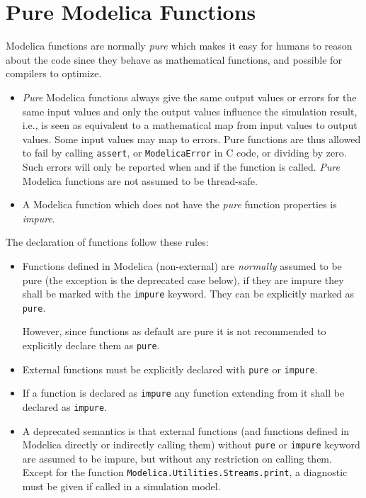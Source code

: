 \section{Pure Modelica Functions}\label{pure-modelica-functions}

Modelica functions are normally \emph{pure} which makes it easy for humans to reason about the code since they behave as mathematical functions, and possible for compilers to optimize.

\begin{itemize}
\item
  \emph{Pure} Modelica functions always give the same output values or errors for the same input values and only the output values influence the simulation result, i.e., is seen as equivalent to a mathematical map from input values to output values.
  Some input values may map to errors.
  Pure functions are thus allowed to fail by calling \lstinline!assert!, or \lstinline[language=C]!ModelicaError! in C code, or dividing by zero.
  Such errors will only be reported when and if the function is called.
  \emph{Pure} Modelica functions are not assumed to be thread-safe.
\item
  A Modelica function which does not have the \emph{pure} function properties is \emph{impure}.
\end{itemize}

The declaration of functions follow these rules:
\begin{itemize}
\item
  Functions defined in Modelica (non-external) are \emph{normally} assumed to be pure (the exception is the deprecated case below), if they are impure they shall be marked with the \lstinline!impure! keyword.
  They can be explicitly marked as \lstinline!pure!.
  \begin{nonnormative}
  However, since functions as default are pure it is not recommended to explicitly declare them as \lstinline!pure!.
  \end{nonnormative}
\item
  External functions must be explicitly declared with \lstinline!pure! or \lstinline!impure!.
\item
  If a function is declared as \lstinline!impure! any function extending from it shall be declared as \lstinline!impure!.
\item
  A deprecated semantics is that external functions (and functions defined in Modelica directly or indirectly calling them) without \lstinline!pure! or \lstinline!impure! keyword are assumed to be impure, but without any restriction on calling them.
  Except for the function \lstinline!Modelica.Utilities.Streams.print!, a diagnostic must be given if called in a simulation model.
\end{itemize}

